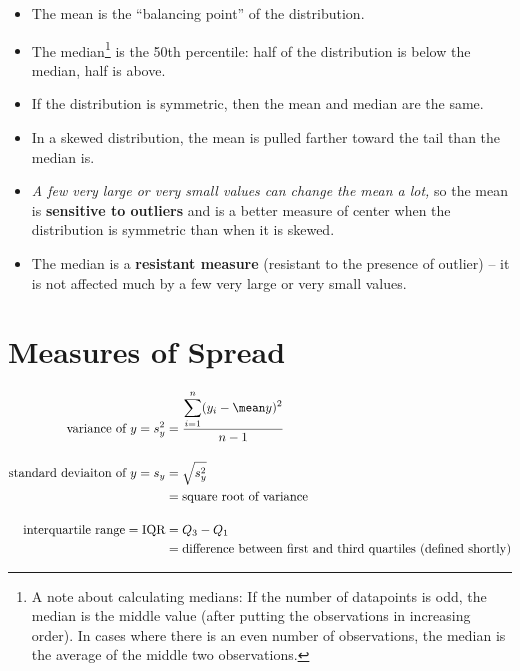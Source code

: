 \documentclass[twoside]{book}\usepackage[]{graphicx}\usepackage[]{xcolor}
\def\term#1{\textbf{#1}}
\begin{document}
\begin{itemize}
\item
The mean is the ``balancing point'' of the distribution.
\item
The median\footnote{A note about calculating medians: If the number of datapoints is odd, the median is the middle value (after putting the observations in increasing order). In cases where there is an even number of observations, the median is the
  average of the middle two observations.} is the 50th percentile: half of the distribution is below the median,
half is above.
\item
If the distribution is symmetric, then the mean and median are the same.
\item
In a skewed distribution, the mean is pulled farther toward the tail than the median is.
\item
\emph{A few very large or very small values can change the mean a lot,}
so the mean is \term{sensitive to outliers} and is a better measure of center
when the distribution is symmetric than when it is skewed.
\item
The median is a \term{resistant measure} (resistant to the presence of outlier) -- it is not affected much by a few very large or very small values.
\end{itemize}



\section{Measures of Spread}

\begin{align*}
\mbox{variance of $y$} 
= s^2_y 
&= 
\frac{\displaystyle \sum_{i=1}^{n} (y_i - \mean y)^2 }{n-1}
\\[4mm]
\mbox{standard deviaiton of $y$} = s_y 
&= \sqrt{s^2_y} 
\\
&= \mbox{square root of variance}
\\[4mm]
\mbox{interquartile range} = \mbox{IQR}
&= Q_3 - Q_1 
\\
& = \mbox{difference between first and third quartiles (defined shortly)}
\end{align*}
\end{document}
